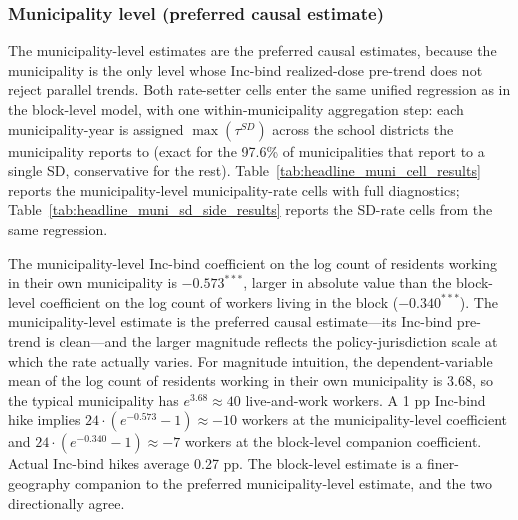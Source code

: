 \documentclass[12pt]{article}
\begin{document}
\subsubsection{Municipality level (preferred causal estimate)}
\label{subsec:results-headline}

The municipality-level estimates are the preferred causal estimates,
because the municipality is the only level whose Inc-bind realized-dose
pre-trend does not reject parallel trends. Both rate-setter cells enter the same
unified regression as in the block-level model, with one
within-municipality aggregation step: each municipality-year is assigned
$\max(\tau^{SD})$ across the school districts the municipality reports to
(exact for the 97.6\% of municipalities that report to a single SD,
conservative for the rest). Table~\ref{tab:headline_muni_cell_results}
reports the municipality-level municipality-rate cells with full diagnostics;
Table~\ref{tab:headline_muni_sd_side_results} reports the SD-rate
cells from the same regression.





The municipality-level Inc-bind coefficient on the log count of
residents working in their own municipality is $-0.573^{***}$,
larger in absolute value than the block-level coefficient on the
log count of workers living in the block ($-0.340^{***}$). The
municipality-level estimate is the preferred causal estimate---its
Inc-bind pre-trend is clean---and the larger magnitude reflects the
policy-jurisdiction scale at which the rate actually varies. For
magnitude intuition, the dependent-variable mean of the log
count of residents working in their own municipality is $3.68$, so
the typical municipality has $e^{3.68} \approx 40$ live-and-work
workers. A 1 pp Inc-bind hike implies
$24\cdot (e^{-0.573} - 1) \approx -10$ workers at the municipality-level
coefficient and $24\cdot (e^{-0.340} - 1) \approx -7$ workers at
the block-level companion coefficient. Actual Inc-bind hikes average
0.27 pp. The block-level estimate is a finer-geography companion to
the preferred municipality-level estimate, and the two directionally
agree.

\end{document}
